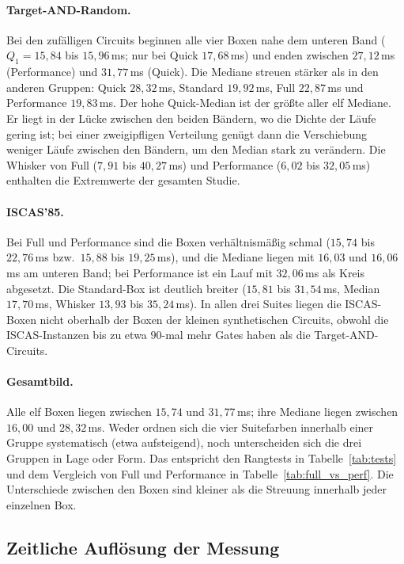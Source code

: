 \documentclass[a4paper,12pt]{article}
\theoremstyle{definition}
\begin{document}
\paragraph{Target-AND-Random.} Bei den zufälligen Circuits beginnen alle vier Boxen nahe dem unteren Band ($Q_1 = 15{,}84$ bis $15{,}96$\,ms; nur bei Quick $17{,}68$\,ms) und enden zwischen $27{,}12$\,ms (Performance) und $31{,}77$\,ms (Quick). Die Mediane streuen stärker als in den anderen Gruppen: Quick $28{,}32$\,ms, Standard $19{,}92$\,ms, Full $22{,}87$\,ms und Performance $19{,}83$\,ms. Der hohe Quick-Median ist der größte aller elf Mediane. Er liegt in der Lücke zwischen den beiden Bändern, wo die Dichte der Läufe gering ist; bei einer zweigipfligen Verteilung genügt dann die Verschiebung weniger Läufe zwischen den Bändern, um den Median stark zu verändern. Die Whisker von Full ($7{,}91$ bis $40{,}27$\,ms) und Performance ($6{,}02$ bis $32{,}05$\,ms) enthalten die Extremwerte der gesamten Studie.

\paragraph{ISCAS'85.} Bei Full und Performance sind die Boxen verhältnismäßig schmal ($15{,}74$ bis $22{,}76$\,ms bzw.\ $15{,}88$ bis $19{,}25$\,ms), und die Mediane liegen mit $16{,}03$ und $16{,}06$\,ms am unteren Band; bei Performance ist ein Lauf mit $32{,}06$\,ms als Kreis abgesetzt. Die Standard-Box ist deutlich breiter ($15{,}81$ bis $31{,}54$\,ms, Median $17{,}70$\,ms, Whisker $13{,}93$ bis $35{,}24$\,ms). In allen drei Suites liegen die ISCAS-Boxen nicht oberhalb der Boxen der kleinen synthetischen Circuits, obwohl die ISCAS-Instanzen bis zu etwa $90$-mal mehr Gates haben als die Target-AND-Circuits.

\paragraph{Gesamtbild.} Alle elf Boxen liegen zwischen $15{,}74$ und $31{,}77$\,ms; ihre Mediane liegen zwischen $16{,}00$ und $28{,}32$\,ms. Weder ordnen sich die vier Suitefarben innerhalb einer Gruppe systematisch (etwa aufsteigend), noch unterscheiden sich die drei Gruppen in Lage oder Form. Das entspricht den Rangtests in Tabelle~\ref{tab:tests} und dem Vergleich von Full und Performance in Tabelle~\ref{tab:full_vs_perf}. Die Unterschiede zwischen den Boxen sind kleiner als die Streuung innerhalb jeder einzelnen Box.

\subsection{Zeitliche Auflösung der Messung}
\label{sec:zeit}
\end{document}

